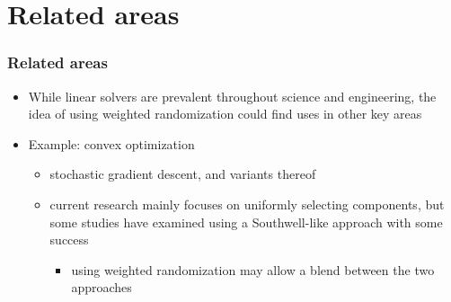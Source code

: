 \documentclass{beamer}
\begin{document}
\section{Related areas}

\begin{frame}
	\frametitle{Related areas}
	\begin{itemize}
		\item While linear solvers are prevalent throughout science and engineering, the idea of using weighted randomization could find uses in other key areas
		\item Example: convex optimization 
			\begin{itemize}
				\item stochastic gradient descent, and variants thereof
				\item current research mainly focuses on uniformly selecting components, but some studies have examined using a Southwell-like approach with some success
					\begin{itemize}
						\item using weighted randomization may allow a blend between the two approaches
					\end{itemize}
			\end{itemize}
	\end{itemize}
\end{frame}
\end{document}

